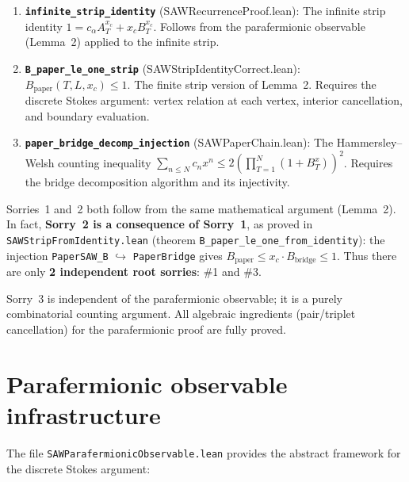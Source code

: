 \begin{lemma}
\begin{enumerate}
\begin{enumerate}
  \item \textbf{\texttt{infinite\_strip\_identity}} (SAWRecurrenceProof.lean):
    The infinite strip identity $1 = c_\alpha A_T^{x_c} + x_c B_T^{x_c}$.
    Follows from the parafermionic observable (Lemma~2) applied to
    the infinite strip.

  \item \textbf{\texttt{B\_paper\_le\_one\_strip}} (SAWStripIdentityCorrect.lean):
    $B_{\text{paper}}(T,L,x_c) \leq 1$. The finite strip version of
    Lemma~2. Requires the discrete Stokes argument: vertex relation at
    each vertex, interior cancellation, and boundary evaluation.

  \item \textbf{\texttt{paper\_bridge\_decomp\_injection}} (SAWPaperChain.lean):
    The Hammersley--Welsh counting inequality
    $\sum_{n \leq N} c_n x^n \leq 2(\prod_{T=1}^N(1+B_T^x))^2$.
    Requires the bridge decomposition algorithm and its injectivity.
\end{enumerate}

Sorries~1 and~2 both follow from the same mathematical argument
(Lemma~2). In fact, \textbf{Sorry~2 is a consequence of Sorry~1},
as proved in \texttt{SAWStripFromIdentity.lean}
(theorem \texttt{B\_paper\_le\_one\_from\_identity}):
the injection \texttt{PaperSAW\_B} $\hookrightarrow$ \texttt{PaperBridge}
gives $B_{\text{paper}} \leq x_c \cdot B_{\text{bridge}} \leq 1$.
Thus there are only \textbf{2 independent root sorries}: \#1 and \#3.

Sorry~3 is independent of the parafermionic observable; it is a purely
combinatorial counting argument. All algebraic ingredients
(pair/triplet cancellation) for the parafermionic proof are fully proved.

\section{Parafermionic observable infrastructure}

The file \texttt{SAWParafermionicObservable.lean} provides the abstract
framework for the discrete Stokes argument:


\end{enumerate}
\end{lemma}
